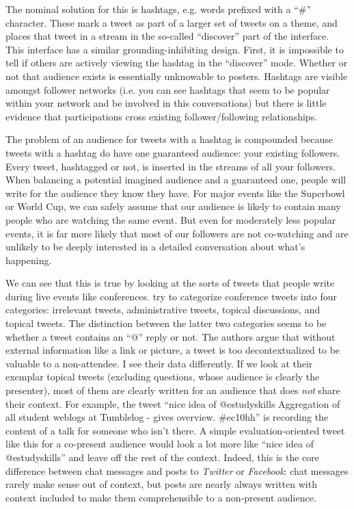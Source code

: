 The nominal solution for this is hashtags, e.g. words prefixed with a ``\#'' character. These mark a tweet as part of a larger set of tweets on a theme, and places that tweet in a stream in the so-called ``discover'' part of the interface. This interface has a similar grounding-inhibiting design. First, it is impossible to tell if others are actively viewing the hashtag in the ``discover'' mode. Whether or not that audience exists is essentially unknowable to posters. Hashtags are visible amongst follower networks (i.e. you can see hashtags that seem to be popular within your network and be involved in this conversations) but there is little evidence that participations cross existing follower/following relationships.

The problem of an audience for tweets with a hashtag is compounded because tweets with a hashtag do have one guaranteed audience: your existing followers. Every tweet, hashtagged or not, is inserted in the streams of all your followers. When balancing a potential imagined audience and a guaranteed one, people will write for the audience they know they have. For major events like the Superbowl or World Cup, we can safely assume that our audience is likely to contain many people who are watching the same event. But even for moderately less popular events, it is far more likely that most of our followers are not co-watching and are unlikely to be deeply interested in a detailed conversation about what's happening. 

We can see that this is true by looking at the sorts of tweets that people write during live events like conferences. \citet{Ebner:2010tx} try to categorize conference tweets into four categories: irrelevant tweets, administrative tweets, topical discussions, and topical tweets. The distinction between the latter two categories seems to be whether a tweet contains an ``@'' reply or not. The authors argue that without external information like a link or picture, a tweet is too decontextualized to be valuable to a non-attendee. I see their data differently. If we look at their exemplar topical tweets (excluding questions, whose audience is clearly the presenter), most of them are clearly written for an audience that does \emph{not} share their context.  For example, the tweet ``nice idea of @estudyskills Aggregation of all student weblogs at Tumblelog - gives overview. \#ec10hh'' is recording the content of a talk for someone who isn't there. A simple evaluation-oriented tweet like this for a co-present audience would look a lot more like ``nice idea of @estudyskills'' and leave off the rest of the context. Indeed, this is the core difference between chat messages and posts to \emph{Twitter} or \emph{Facebook}: chat messages rarely make sense out of context, but posts are nearly always written with context included to make them comprehensible to a non-present audience. 

